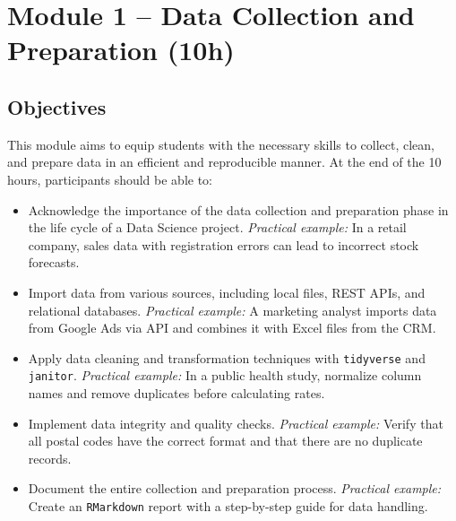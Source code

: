\section{\textcolor{sectionred}{Module 1 – Data Collection and Preparation (10h)}}

\subsection{\textcolor{subsectionblue}{Objectives}}
This module aims to equip students with the necessary skills to collect, clean, and prepare data in an efficient and reproducible manner. At the end of the 10 hours, participants should be able to:
\begin{itemize}
  \item Acknowledge the importance of the data collection and preparation phase in the life cycle of a Data Science project.  
  \textit{Practical example:} In a retail company, sales data with registration errors can lead to incorrect stock forecasts.
  \item Import data from various sources, including local files, REST APIs, and relational databases.  
  \textit{Practical example:} A marketing analyst imports data from Google Ads via API and combines it with Excel files from the CRM.
  \item Apply data cleaning and transformation techniques with \texttt{tidyverse} and \texttt{janitor}.  
  \textit{Practical example:} In a public health study, normalize column names and remove duplicates before calculating rates.
  \item Implement data integrity and quality checks.  
  \textit{Practical example:} Verify that all postal codes have the correct format and that there are no duplicate records.
  \item Document the entire collection and preparation process.  
  \textit{Practical example:} Create an \texttt{RMarkdown} report with a step-by-step guide for data handling.
\end{itemize}

